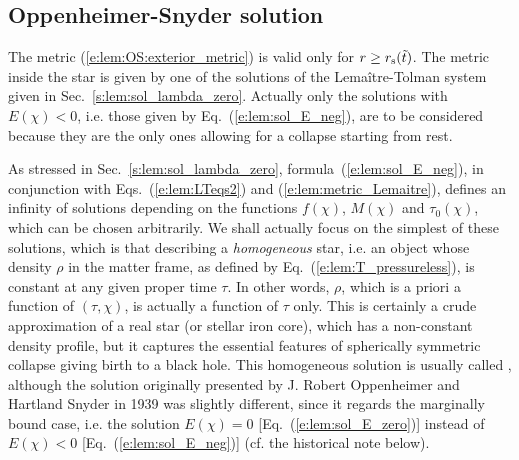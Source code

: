 \subsection{Oppenheimer-Snyder solution} \label{s:lem:OS_sol}

The metric (\ref{e:lem:OS:exterior_metric}) is valid only for $r \geq r_{\rm s}({\tilde t})$.
The metric inside the star is given by one of the solutions
of the Lemaître-Tolman system given in Sec.~\ref{s:lem:sol_lambda_zero}.
Actually only the solutions with $E(\chi)<0$, i.e. those given by Eq.~(\ref{e:lem:sol_E_neg}),
are to be considered because they are the only ones allowing for a collapse starting
from rest.

As stressed in Sec.~\ref{s:lem:sol_lambda_zero}, formula~(\ref{e:lem:sol_E_neg}),
in conjunction with Eqs.~(\ref{e:lem:LTeqs2}) and
(\ref{e:lem:metric_Lemaitre}),
defines an infinity of solutions depending on the functions
$f(\chi)$, $M(\chi)$ and $\tau_0(\chi)$, which can be chosen arbitrarily.
We shall actually focus on the simplest of these solutions, which is that
describing a \emph{homogeneous} star, i.e. an object whose density
$\rho$ in the matter frame, as defined by Eq.~(\ref{e:lem:T_pressureless}),
is constant at any given proper time $\tau$. In other words, $\rho$, which
is a priori a function of $(\tau,\chi)$, is actually a function of $\tau$ only.
This is certainly a crude approximation of a real star (or stellar iron core),
which has a non-constant density profile, but it captures the essential
features of spherically symmetric collapse giving birth to a black hole.
This homogeneous solution is usually called
,
although the solution originally presented by J. Robert Oppenheimer
and Hartland Snyder in 1939 \cite{OppenS1939} was slightly
different, since it regards the marginally bound case, i.e. the solution $E(\chi) = 0$
[Eq.~(\ref{e:lem:sol_E_zero})] instead of $E(\chi)<0$ [Eq.~(\ref{e:lem:sol_E_neg})]
(cf. the historical note below).


